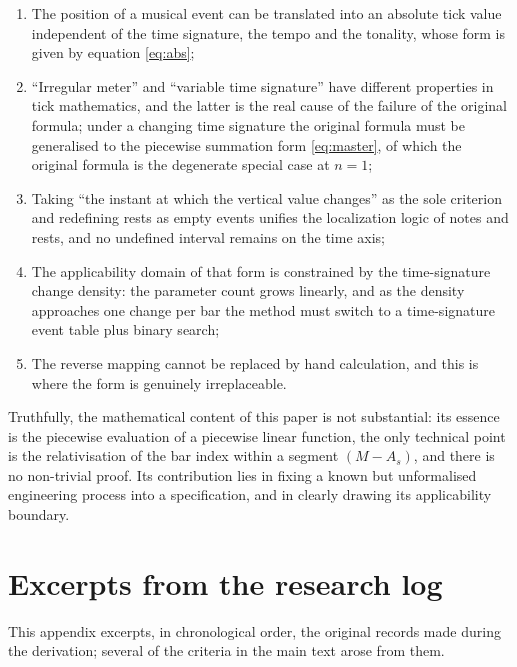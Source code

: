 \documentclass[11pt,a4paper]{article}
\begin{document}
\begin{enumerate}[leftmargin=2.2em,itemsep=0.15em,topsep=0.2em]
  \item The position of a musical event can be translated into an absolute tick value
        independent of the time signature, the tempo and the tonality, whose form is
        given by equation \eqref{eq:abs};
  \item ``Irregular meter'' and ``variable time signature'' have different properties in
        tick mathematics, and the latter is the real cause of the failure of the original
        formula; under a changing time signature the original formula must be generalised
        to the piecewise summation form \eqref{eq:master}, of which the original formula
        is the degenerate special case at $n=1$;
  \item Taking ``the instant at which the vertical value changes'' as the sole criterion
        and redefining rests as empty events unifies the localization logic of notes and
        rests, and no undefined interval remains on the time axis;
  \item The applicability domain of that form is constrained by the time-signature
        change density: the parameter count grows linearly, and as the density approaches
        one change per bar the method must switch to a time-signature event table plus
        binary search;
  \item The reverse mapping cannot be replaced by hand calculation, and this is where
        the form is genuinely irreplaceable.
\end{enumerate}

Truthfully, the mathematical content of this paper is not substantial: its essence is
the piecewise evaluation of a piecewise linear function, the only technical point is the
relativisation of the bar index within a segment $(M-A_s)$, and there is no non-trivial
proof. Its contribution lies in fixing a known but unformalised engineering process into
a specification, and in clearly drawing its applicability boundary.



\appendix

\section{Excerpts from the research log}
This appendix excerpts, in chronological order, the original records made during the
derivation; several of the criteria in the main text arose from them.
\end{document}
